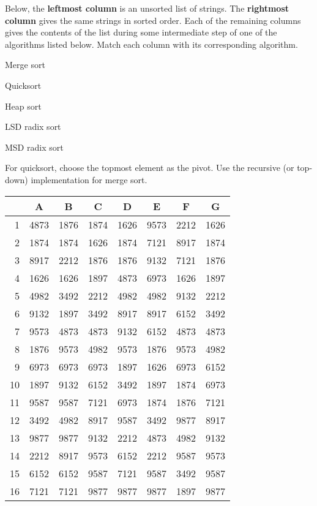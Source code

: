 \question Below, the \textbf{leftmost column} is an unsorted list of strings. The \textbf{rightmost column} gives the same strings in sorted order. Each of the remaining columns gives the contents of the list during some intermediate step of one of the algorithms listed below. Match each column with its corresponding algorithm.

\begin{inparaitem}[$\cdot$]
\item Merge sort
\item Quicksort
\item Heap sort
\item LSD radix sort
\item MSD radix sort
\end{inparaitem}

For quicksort, choose the topmost element as the pivot. Use the recursive (or top-down) implementation for merge sort.

{
\renewcommand{\arraystretch}{1.5}
\setlength{\tabcolsep}{12pt}
\begin{ttfamily}
\begin{tabular}{r|ccccccc}
   & A    & B    & C    & D    & E    & F    & G    \\\hline
1  & 4873 & 1876 & 1874 & 1626 & 9573 & 2212 & 1626 \\
2  & 1874 & 1874 & 1626 & 1874 & 7121 & 8917 & 1874 \\
3  & 8917 & 2212 & 1876 & 1876 & 9132 & 7121 & 1876 \\
4  & 1626 & 1626 & 1897 & 4873 & 6973 & 1626 & 1897 \\
5  & 4982 & 3492 & 2212 & 4982 & 4982 & 9132 & 2212 \\
6  & 9132 & 1897 & 3492 & 8917 & 8917 & 6152 & 3492 \\
7  & 9573 & 4873 & 4873 & 9132 & 6152 & 4873 & 4873 \\
8  & 1876 & 9573 & 4982 & 9573 & 1876 & 9573 & 4982 \\
9  & 6973 & 6973 & 6973 & 1897 & 1626 & 6973 & 6152 \\
10 & 1897 & 9132 & 6152 & 3492 & 1897 & 1874 & 6973 \\
11 & 9587 & 9587 & 7121 & 6973 & 1874 & 1876 & 7121 \\
12 & 3492 & 4982 & 8917 & 9587 & 3492 & 9877 & 8917 \\
13 & 9877 & 9877 & 9132 & 2212 & 4873 & 4982 & 9132 \\
14 & 2212 & 8917 & 9573 & 6152 & 2212 & 9587 & 9573 \\
15 & 6152 & 6152 & 9587 & 7121 & 9587 & 3492 & 9587 \\
16 & 7121 & 7121 & 9877 & 9877 & 9877 & 1897 & 9877
\end{tabular}
\end{ttfamily}
}


